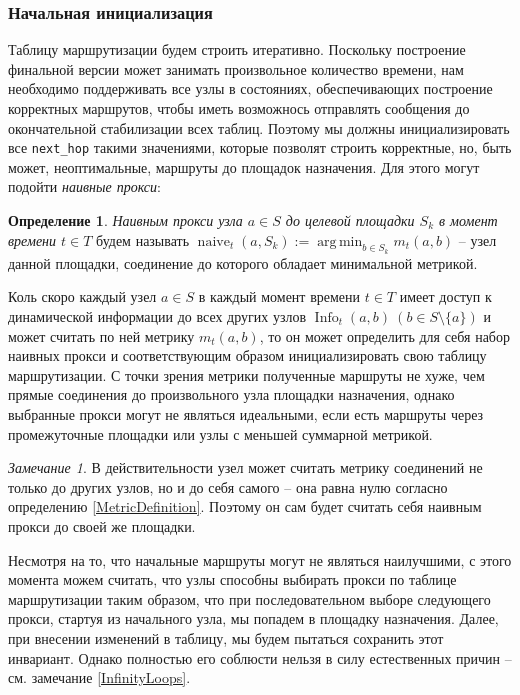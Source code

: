 \documentclass{article}
\theoremstyle{plain}
\theoremstyle{plain}
\theoremstyle{plain}
\theoremstyle{plain}
\theoremstyle{definition}
\newtheorem{definition}{Определение}[section]
\theoremstyle{remark}
\newtheorem{remark}{Замечание}[section]
\theoremstyle{plain}
\DeclareMathOperator*{\argmin}{arg\,min}
\DeclareMathOperator*{\info}{Info}
\DeclareMathOperator*{\naive}{naive}
\begin{document}
\subsubsection{Начальная инициализация}
\label{RT_Initialization}

Таблицу маршрутизации будем строить итеративно. Поскольку построение финальной версии может занимать произвольное количество времени, нам необходимо поддерживать все узлы в состояниях, обеспечивающих построение корректных маршрутов, чтобы иметь возможнось отправлять сообщения до окончательной стабилизации всех таблиц. Поэтому мы должны инициализировать все \texttt{next\_hop} такими значениями, которые позволят строить корректные, но, быть может, неоптимальные, маршруты до площадок назначения. Для этого могут подойти \textit{наивные прокси}:

\begin{definition}
    \textit{Наивным прокси узла $a \in S$ до целевой площадки $S_k$ в момент времени $t \in T$} будем называть $\naive_t(a, S_k) := \displaystyle \argmin_{b \in S_k} m_t(a, b)$ -- узел данной площадки, соединение до которого обладает минимальной метрикой.
\end{definition}

Коль скоро каждый узел $a \in S$ в каждый момент времени $t \in T$ имеет доступ к динамической информации до всех других узлов $\info_t(a, b)\ (b \in S \setminus \{a\})$ и может считать по ней метрику $m_t(a, b)$, то он может определить для себя набор наивных прокси и соответствующим образом инициализировать свою таблицу маршрутизации. С точки зрения метрики полученные маршруты не хуже, чем прямые соединения до произвольного узла площадки назначения, однако выбранные прокси могут не являться идеальными, если есть маршруты через промежуточные площадки или узлы с меньшей суммарной метрикой.

\begin{remark}
\label{SelfRouting}
    В действительности узел может считать метрику соединений не только до других узлов, но и до себя самого -- она равна нулю согласно определению \ref{MetricDefinition}. Поэтому он сам будет считать себя наивным прокси до своей же площадки.
\end{remark}

Несмотря на то, что начальные маршруты могут не являться наилучшими, с этого момента можем считать, что узлы способны выбирать прокси по таблице маршрутизации таким образом, что при последовательном выборе следующего прокси, стартуя из начального узла, мы попадем в площадку назначения. Далее, при внесении изменений в таблицу, мы будем пытаться сохранить этот инвариант. Однако полностью его соблюсти нельзя в силу естественных причин -- см. замечание \ref{InfinityLoops}.
\end{document}
